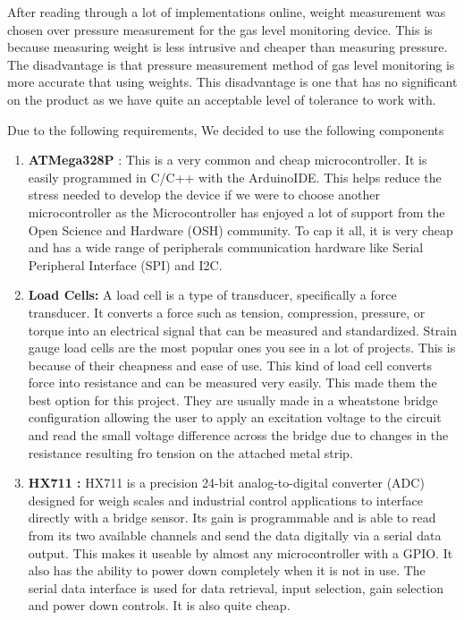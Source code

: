 After reading through a lot of implementations online, weight measurement was chosen over pressure measurement for the gas level monitoring device. This is because measuring weight is less intrusive and cheaper than measuring pressure. The disadvantage is that 
pressure measurement method of gas level monitoring is more accurate that using weights. This disadvantage is one that has no significant on the product as we have quite an acceptable level of tolerance to work with. 

Due to the following requirements, We decided to use the following components
\begin{enumerate}
\item \textbf{ATMega328P} : This is a very common and cheap microcontroller. It is easily programmed in C/C++ with the ArduinoIDE.
This helps reduce the stress needed to develop the device if we were to choose another microcontroller as the Microcontroller has enjoyed a lot of support from the Open Science and Hardware (OSH) community. To cap it all, it is very cheap and has a wide range of peripherals communication hardware like Serial Peripheral Interface (SPI) and I2C.

\item \textbf{Load Cells:} A load cell is a type of transducer, specifically a force transducer. It converts a force such as tension, compression, pressure, or torque into an electrical signal that can be measured and standardized. Strain gauge load cells are the most popular ones you see in a lot of projects. This is because of their cheapness and ease of use. This kind of load cell converts force into resistance and can be measured very easily. This made them the best option for this project. They are usually made in a wheatstone bridge configuration allowing the user to apply an excitation voltage to the circuit and read the small voltage difference across the bridge due to changes in the resistance resulting fro tension on the attached metal strip.

\item \textbf{HX711 :} HX711 is a precision 24-bit analog-to-digital converter (ADC) designed for weigh scales and industrial   control   applications to interface directly with a bridge sensor. Its gain is programmable and is able to read from its two available channels and send the data digitally via a serial data output. This makes it useable by almost any microcontroller with a GPIO. It also has the ability to power down completely when it is not in use. The serial data interface is used for data retrieval, input selection, gain selection and power down controls. It is also quite cheap.


\end{enumerate}
